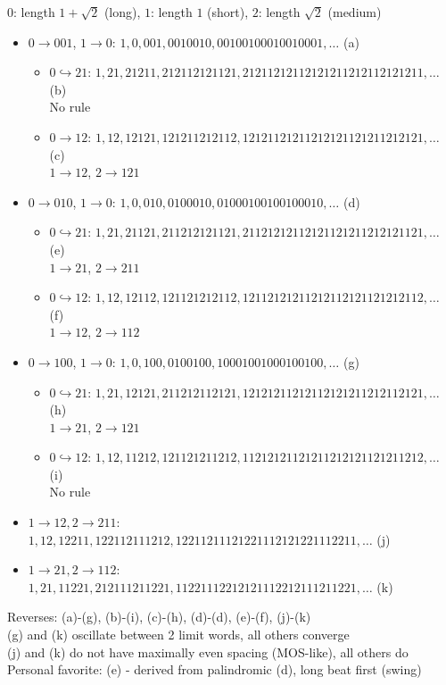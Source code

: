 \documentclass{article}
\begin{document}
$0$: length $1+\sqrt{2}$ (long), $1$: length $1$ (short), $2$: length $\sqrt{2}$ (medium)
\begin{itemize}
\item
  $0 \rightarrow 001$, $1 \rightarrow 0$:
  $1, 0, 001, 0010010, 00100100010010001, \ldots$ (a)
  \begin{itemize}
  \item
    $0 \hookrightarrow 21$:
    $1, 21, 21211, 212112121121, 21211212112121211212112121211, \ldots$ (b) \\
    No rule
  \item
    $0 \rightarrow 12$:
    $1, 12, 12121, 121211212112, 12121121211212121121211212121, \ldots$ (c) \\
    $1 \rightarrow 12$, $2 \rightarrow 121$
  \end{itemize}
\item
  $0 \rightarrow 010$, $1 \rightarrow 0$:
  $1, 0, 010, 0100010, 01000100100100010, \ldots$ (d)
  \begin{itemize}
  \item
    $0 \hookrightarrow 21$:
    $1, 21, 21121, 211212121121, 21121212112121121211212121121, \ldots$ (e) \\
    $1 \rightarrow 21$, $2 \rightarrow 211$
  \item
    $0 \hookrightarrow 12$:
    $1, 12, 12112, 121121212112, 12112121211212112121121212112, \ldots$ (f) \\
    $1 \rightarrow 12$, $2 \rightarrow 112$
  \end{itemize}
\item
  $0 \rightarrow 100$, $1 \rightarrow 0$:
  $1, 0, 100, 0100100, 10001001000100100, \ldots$ (g)
  \begin{itemize}
  \item
    $0 \hookrightarrow 21$:
    $1, 21, 12121, 211212112121, 12121211212112121211212112121, \ldots$ (h) \\
    $1 \rightarrow 21$, $2 \rightarrow 121$
  \item
    $0 \hookrightarrow 12$:
    $1, 12, 11212, 121121211212, 11212121121211212121121211212, \ldots$ (i) \\
    No rule
  \end{itemize}
\item $1 \rightarrow 12, 2 \rightarrow 211$:
  $1, 12, 12211, 122112111212, 12211211121221112121221112211, \ldots$ (j)
\item $1 \rightarrow 21, 2 \rightarrow 112$:
  $1, 21, 11221, 212111211221, 11221112212121112212111211221, \ldots$ (k)
\end{itemize}
Reverses: (a)-(g), (b)-(i), (c)-(h), (d)-(d), (e)-(f), (j)-(k) \\
(g) and (k) oscillate between 2 limit words, all others converge \\
(j) and (k) do not have maximally even spacing (MOS-like), all others do \\
Personal favorite: (e) - derived from palindromic (d), long beat first (swing)
\end{document}
